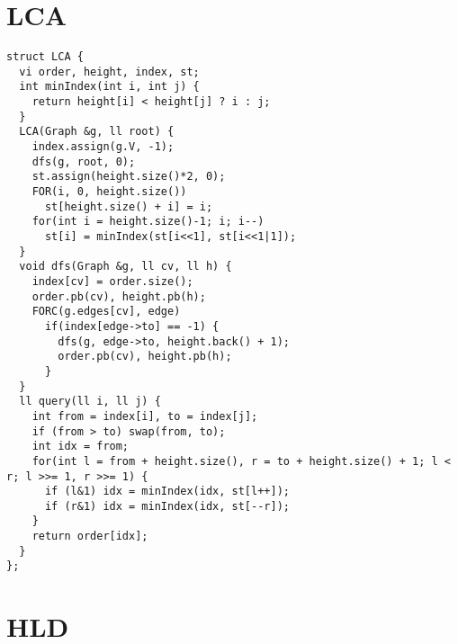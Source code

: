 \documentclass[8pt, oneside]{extarticle}
\begin{document}
\begin{multicols}{3}
\begin{lstlisting}
\end{lstlisting}

\section{LCA}
\begin{lstlisting}
struct LCA {
  vi order, height, index, st;
  int minIndex(int i, int j) {
    return height[i] < height[j] ? i : j;
  }
  LCA(Graph &g, ll root) {
    index.assign(g.V, -1);
    dfs(g, root, 0);
    st.assign(height.size()*2, 0);
    FOR(i, 0, height.size())
      st[height.size() + i] = i;
    for(int i = height.size()-1; i; i--)
      st[i] = minIndex(st[i<<1], st[i<<1|1]);
  }
  void dfs(Graph &g, ll cv, ll h) {
    index[cv] = order.size();
    order.pb(cv), height.pb(h);
    FORC(g.edges[cv], edge)
      if(index[edge->to] == -1) {
        dfs(g, edge->to, height.back() + 1);
        order.pb(cv), height.pb(h);
      }
  }
  ll query(ll i, ll j) {
    int from = index[i], to = index[j];
    if (from > to) swap(from, to);
    int idx = from;
    for(int l = from + height.size(), r = to + height.size() + 1; l < r; l >>= 1, r >>= 1) {
      if (l&1) idx = minIndex(idx, st[l++]);
      if (r&1) idx = minIndex(idx, st[--r]);
    }
    return order[idx];
  }
};
\end{lstlisting}

\section{HLD}
\begin{lstlisting}


\end{lstlisting}
\end{multicols}
\end{document}

